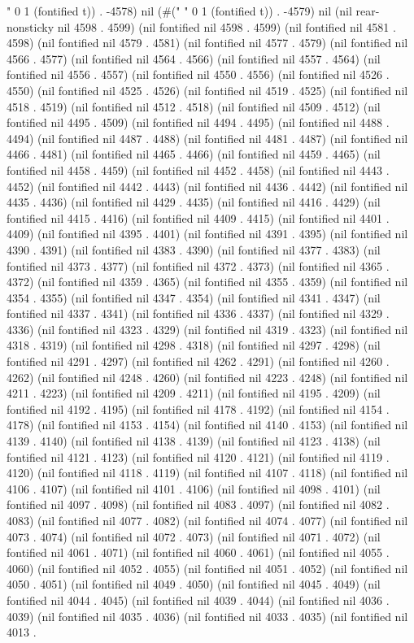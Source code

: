 " 0 1 (fontified t)) . -4578) nil (#(" " 0 1 (fontified t)) . -4579) nil (nil rear-nonsticky nil 4598 . 4599) (nil fontified nil 4598 . 4599) (nil fontified nil 4581 . 4598) (nil fontified nil 4579 . 4581) (nil fontified nil 4577 . 4579) (nil fontified nil 4566 . 4577) (nil fontified nil 4564 . 4566) (nil fontified nil 4557 . 4564) (nil fontified nil 4556 . 4557) (nil fontified nil 4550 . 4556) (nil fontified nil 4526 . 4550) (nil fontified nil 4525 . 4526) (nil fontified nil 4519 . 4525) (nil fontified nil 4518 . 4519) (nil fontified nil 4512 . 4518) (nil fontified nil 4509 . 4512) (nil fontified nil 4495 . 4509) (nil fontified nil 4494 . 4495) (nil fontified nil 4488 . 4494) (nil fontified nil 4487 . 4488) (nil fontified nil 4481 . 4487) (nil fontified nil 4466 . 4481) (nil fontified nil 4465 . 4466) (nil fontified nil 4459 . 4465) (nil fontified nil 4458 . 4459) (nil fontified nil 4452 . 4458) (nil fontified nil 4443 . 4452) (nil fontified nil 4442 . 4443) (nil fontified nil 4436 . 4442) (nil fontified nil 4435 . 4436) (nil fontified nil 4429 . 4435) (nil fontified nil 4416 . 4429) (nil fontified nil 4415 . 4416) (nil fontified nil 4409 . 4415) (nil fontified nil 4401 . 4409) (nil fontified nil 4395 . 4401) (nil fontified nil 4391 . 4395) (nil fontified nil 4390 . 4391) (nil fontified nil 4383 . 4390) (nil fontified nil 4377 . 4383) (nil fontified nil 4373 . 4377) (nil fontified nil 4372 . 4373) (nil fontified nil 4365 . 4372) (nil fontified nil 4359 . 4365) (nil fontified nil 4355 . 4359) (nil fontified nil 4354 . 4355) (nil fontified nil 4347 . 4354) (nil fontified nil 4341 . 4347) (nil fontified nil 4337 . 4341) (nil fontified nil 4336 . 4337) (nil fontified nil 4329 . 4336) (nil fontified nil 4323 . 4329) (nil fontified nil 4319 . 4323) (nil fontified nil 4318 . 4319) (nil fontified nil 4298 . 4318) (nil fontified nil 4297 . 4298) (nil fontified nil 4291 . 4297) (nil fontified nil 4262 . 4291) (nil fontified nil 4260 . 4262) (nil fontified nil 4248 . 4260) (nil fontified nil 4223 . 4248) (nil fontified nil 4211 . 4223) (nil fontified nil 4209 . 4211) (nil fontified nil 4195 . 4209) (nil fontified nil 4192 . 4195) (nil fontified nil 4178 . 4192) (nil fontified nil 4154 . 4178) (nil fontified nil 4153 . 4154) (nil fontified nil 4140 . 4153) (nil fontified nil 4139 . 4140) (nil fontified nil 4138 . 4139) (nil fontified nil 4123 . 4138) (nil fontified nil 4121 . 4123) (nil fontified nil 4120 . 4121) (nil fontified nil 4119 . 4120) (nil fontified nil 4118 . 4119) (nil fontified nil 4107 . 4118) (nil fontified nil 4106 . 4107) (nil fontified nil 4101 . 4106) (nil fontified nil 4098 . 4101) (nil fontified nil 4097 . 4098) (nil fontified nil 4083 . 4097) (nil fontified nil 4082 . 4083) (nil fontified nil 4077 . 4082) (nil fontified nil 4074 . 4077) (nil fontified nil 4073 . 4074) (nil fontified nil 4072 . 4073) (nil fontified nil 4071 . 4072) (nil fontified nil 4061 . 4071) (nil fontified nil 4060 . 4061) (nil fontified nil 4055 . 4060) (nil fontified nil 4052 . 4055) (nil fontified nil 4051 . 4052) (nil fontified nil 4050 . 4051) (nil fontified nil 4049 . 4050) (nil fontified nil 4045 . 4049) (nil fontified nil 4044 . 4045) (nil fontified nil 4039 . 4044) (nil fontified nil 4036 . 4039) (nil fontified nil 4035 . 4036) (nil fontified nil 4033 . 4035) (nil fontified nil 4013 . 